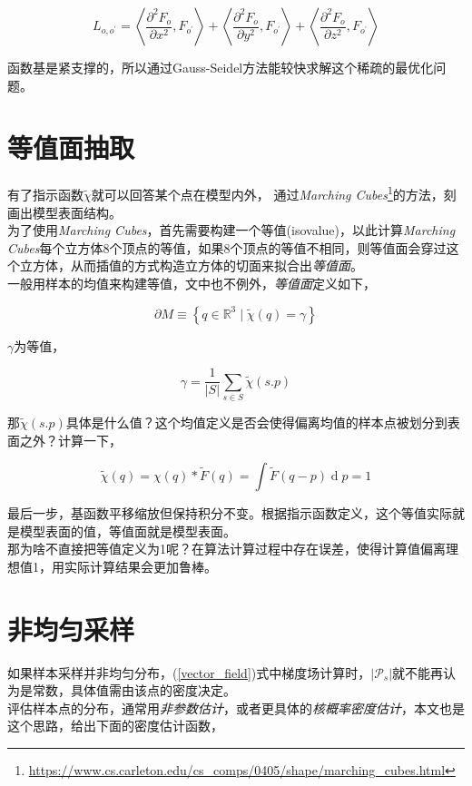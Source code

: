		$$
			L_{o,o^{\prime}} = \left< \frac{\partial^2 F_o}{\partial x^2}, F_{o^{\prime}}\right>
				+ \left< \frac{\partial^2 F_o}{\partial y^2}, F_{o^{\prime}}\right>
				+ \left< \frac{\partial^2 F_o}{\partial z^2}, F_{o^{\prime}}\right>
		$$

		函数基是紧支撑的，所以通过Gauss-Seidel方法能较快求解这个稀疏的最优化问题。

\section{等值面抽取}
	有了指示函数$\tilde{\chi}$就可以回答某个点在模型内外，	通过\textit{Marching Cubes}\footnote{\url{https://www.cs.carleton.edu/cs_comps/0405/shape/marching_cubes.html}}的方法，刻画出模型表面结构。\\

	为了使用\textit{Marching Cubes}，首先需要构建一个等值(isovalue)，以此计算\textit{Marching Cubes}每个立方体8个顶点的等值，如果8个顶点的等值不相同，则等值面会穿过这个立方体，从而插值的方式构造立方体的切面来拟合出\textit{等值面}。\\

	一般用样本的均值来构建等值，文中也不例外，\textit{等值面}定义如下，

	$$
		\partial M \equiv \left\lbrace q \in \mathbb{R}^3 \mid \tilde{\chi}(q) = \gamma\right\rbrace
	$$

	$\gamma$为等值，

	$$
		\gamma = \frac{1}{|S|} \sum_{s \in S}\tilde{\chi}(s.p)
	$$

	那$\tilde{\chi}(s.p)$具体是什么值？这个均值定义是否会使得偏离均值的样本点被划分到表面之外？计算一下，

	$$
		\tilde{\chi}(q) = \chi(q) * \tilde{F}(q) = \int \tilde{F}(q-p)\mathop{d}p = 1
	$$

	最后一步，基函数平移缩放但保持积分不变。根据指示函数定义，这个等值实际就是模型表面的值，等值面就是模型表面。\\

	那为啥不直接把等值定义为1呢？在算法计算过程中存在误差，使得计算值偏离理想值1，用实际计算结果会更加鲁棒。

\section{非均匀采样}
	如果样本采样并非均匀分布，(\ref{vector_field})式中梯度场计算时，$|\mathcal{P}_s|$就不能再认为是常数，具体值需由该点的密度决定。\\

	评估样本点的分布，通常用\textit{非参数估计}，或者更具体的\textit{核概率密度估计}，本文也是这个思路，给出下面的密度估计函数，

